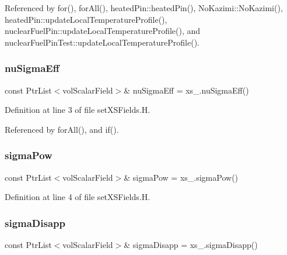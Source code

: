 Referenced by for(), for\+All(), heated\+Pin\+::heated\+Pin(), No\+Kazimi\+::\+No\+Kazimi(), heated\+Pin\+::update\+Local\+Temperature\+Profile(), nuclear\+Fuel\+Pin\+::update\+Local\+Temperature\+Profile(), and nuclear\+Fuel\+Pin\+Test\+::update\+Local\+Temperature\+Profile().

\mbox{\label{setXSFields_8H_aa603f5e77d24550aec5d6843a62d3707}} 
\subsubsection{\texorpdfstring{nu\+Sigma\+Eff}{nuSigmaEff}}
{\footnotesize\ttfamily const Ptr\+List$<$vol\+Scalar\+Field$>$\& nu\+Sigma\+Eff = xs\+\_\+.\+nu\+Sigma\+Eff()}



Definition at line 3 of file set\+X\+S\+Fields.\+H.



Referenced by for\+All(), and if().

\mbox{\label{setXSFields_8H_ac04a1be049ae486d7c60fa591093c834}} 
\subsubsection{\texorpdfstring{sigma\+Pow}{sigmaPow}}
{\footnotesize\ttfamily const Ptr\+List$<$vol\+Scalar\+Field$>$\& sigma\+Pow = xs\+\_\+.\+sigma\+Pow()}



Definition at line 4 of file set\+X\+S\+Fields.\+H.

\mbox{\label{setXSFields_8H_a26e2cc0a2f240dbf0b8888db0c8869e2}} 
\subsubsection{\texorpdfstring{sigma\+Disapp}{sigmaDisapp}}
{\footnotesize\ttfamily const Ptr\+List$<$vol\+Scalar\+Field$>$\& sigma\+Disapp = xs\+\_\+.\+sigma\+Disapp()}




